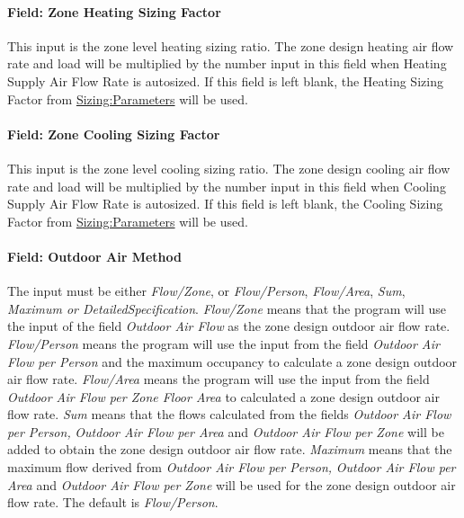 \paragraph{Field: Zone Heating Sizing Factor}\label{field-zone-heating-sizing-factor-4}

This input is the zone level heating sizing ratio. The zone design heating air flow rate and load will be multiplied by the number input in this field when Heating Supply Air Flow Rate is autosized. If this field is left blank, the Heating Sizing Factor from \hyperref[sizingparameters]{Sizing:Parameters} will be used.

\paragraph{Field: Zone Cooling Sizing Factor}\label{field-zone-cooling-sizing-factor-3}

This input is the zone level cooling sizing ratio. The zone design cooling air flow rate and load will be multiplied by the number input in this field when Cooling Supply Air Flow Rate is autosized. If this field is left blank, the Cooling Sizing Factor from \hyperref[sizingparameters]{Sizing:Parameters} will be used.

\paragraph{Field: Outdoor Air Method}\label{field-outdoor-air-method-5}

The input must be either \emph{Flow/Zone}, or \emph{Flow/Person}, \emph{Flow/Area}, \emph{Sum}, \emph{Maximum or DetailedSpecification}. \emph{Flow/Zone} means that the program will use the input of the field \emph{Outdoor Air Flow} as the zone design outdoor air flow rate. \emph{Flow/Person} means the program will use the input from the field \emph{Outdoor Air Flow per Person} and the maximum occupancy to calculate a zone design outdoor air flow rate. \emph{Flow/Area} means the program will use the input from the field \emph{Outdoor Air Flow per Zone Floor Area} to calculated a zone design outdoor air flow rate. \emph{Sum} means that the flows calculated from the fields \emph{Outdoor Air Flow per Person,} \emph{Outdoor Air Flow per Area} and \emph{Outdoor Air Flow per Zone} will be added to obtain the zone design outdoor air flow rate. \emph{Maximum} means that the maximum flow derived from \emph{Outdoor Air Flow per Person,} \emph{Outdoor Air Flow per Area} and \emph{Outdoor Air Flow per Zone} will be used for the zone design outdoor air flow rate. The default is \emph{Flow/Person}.


